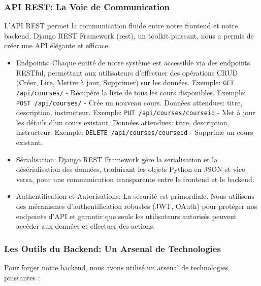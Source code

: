 \subsubsection{API REST: La Voie de Communication}

L'API REST permet la communication fluide entre notre frontend et notre backend.  Django REST Framework (\gls{rest}), un toolkit puissant, nous a permis de créer une API élégante et efficace.
\begin{itemize}
    \item Endpoints: Chaque entité de notre système est accessible via des endpoints RESTful, permettant aux utilisateurs d'effectuer des opérations CRUD (Créer, Lire, Mettre à jour, Supprimer) sur les données.
        \subitem Exemple:  \texttt{GET /api/courses/} - Récupère la liste de tous les cours disponibles.
        \subitem Exemple:  \texttt{POST /api/courses/} - Crée un nouveau cours.  Données attendues: titre, description, instructeur.
        \subitem Exemple:  \texttt{PUT /api/courses/{courseid}} - Met à jour les détails d'un cours existant.  Données attendues: titre, description, instructeur.
        \subitem Exemple:  \texttt{DELETE /api/courses/{courseid}} - Supprime un cours existant.
    \item Sérialisation:   Django REST Framework gère la \gls{serialisation} et la désérialisation des données, traduisant les objets Python en JSON et vice versa, pour une communication transparente entre le frontend et le backend.
    \item Authentification et Autorisations:  La sécurité est primordiale.  Nous utilisons des mécanismes d'authentification robustes (JWT, OAuth) pour protéger nos endpoints d'API et garantir que seuls les utilisateurs autorisés peuvent accéder aux données et effectuer des actions.
\end{itemize}

\subsubsection{Les Outils du Backend: Un Arsenal de Technologies}

Pour forger notre backend, nous avons utilisé un arsenal de technologies puissantes :

